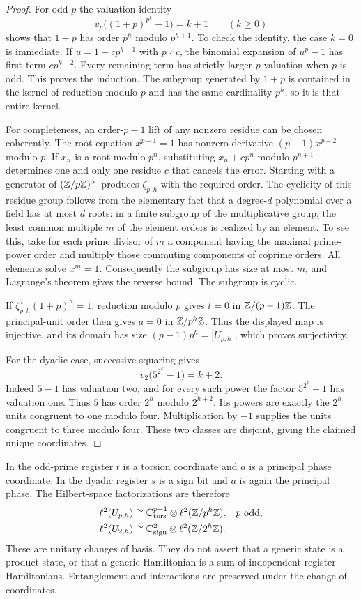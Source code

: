 \begin{proof}
For odd $p$ the valuation identity
\[
 v_p\bigl((1+p)^{p^k}-1\bigr)=k+1
 \qquad(k\geq0)
\]
shows that $1+p$ has order $p^h$ modulo $p^{h+1}$. To check the
identity, the case $k=0$ is immediate. If $u=1+c p^{k+1}$ with
$p\nmid c$, the binomial expansion of $u^p-1$ has first term
$c p^{k+2}$. Every remaining term has strictly larger $p$-valuation
when $p$ is odd. This proves the induction. The subgroup generated by
$1+p$ is contained in the kernel of reduction modulo $p$ and has the
same cardinality $p^h$, so it is that entire kernel.

For completeness, an order-$p-1$ lift of any nonzero residue can be chosen
coherently. The root equation $x^{p-1}=1$ has nonzero derivative
$(p-1)x^{p-2}$ modulo $p$. If $x_n$ is a root modulo $p^n$, substituting
$x_n+c p^n$ modulo $p^{n+1}$ determines one and only one residue $c$
that cancels the error. Starting with a generator of
$(\mathbb Z/p\mathbb Z)^\times$ produces $\zeta_{p,h}$ with the required order.
The cyclicity of this residue group follows from the elementary fact that
a degree-$d$ polynomial over a field has at most $d$ roots: in a finite
subgroup of the multiplicative group, the least common multiple $m$ of
the element orders is realized by an element. To see this, take for each
prime divisor of $m$ a component having the maximal prime-power order
and multiply those commuting components of coprime orders. All elements solve
$x^m=1$. Consequently the subgroup has size at most $m$, and Lagrange's
theorem gives the reverse bound. The subgroup is cyclic.

If $\zeta_{p,h}^{\,t}(1+p)^a=1$, reduction modulo $p$ gives
$t=0$ in $\mathbb Z/(p-1)\mathbb Z$. The principal-unit order then gives
$a=0$ in $\mathbb Z/p^h\mathbb Z$. Thus the displayed map is injective, and its
domain has size $(p-1)p^h=|U_{p,h}|$, which proves surjectivity.

For the dyadic case, successive squaring gives
\[
 v_2\bigl(5^{2^k}-1\bigr)=k+2.
\]
Indeed $5-1$ has valuation two, and for every such power the factor
$5^{2^k}+1$ has valuation one. Thus $5$ has order $2^h$ modulo
$2^{h+2}$. Its powers are exactly the $2^h$ units congruent to one
modulo four. Multiplication by $-1$ supplies the units congruent to
three modulo four. These two classes are disjoint, giving the claimed
unique coordinates.
\end{proof}

In the odd-prime register $t$ is a torsion coordinate and $a$ is a
principal phase coordinate. In the dyadic register $s$ is a sign bit and
$a$ is again the principal phase. The Hilbert-space factorizations are
therefore
\begin{align}
 \ell^2(U_{p,h})&\cong
 \mathbb C^{p-1}_{\mathrm{tors}}\otimes\ell^2(\mathbb Z/p^h\mathbb Z),
 &&p\text{ odd},\nonumber\\
 \ell^2(U_{2,h})&\cong
 \mathbb C^2_{\mathrm{sign}}\otimes\ell^2(\mathbb Z/2^h\mathbb Z).
 \label{a-finite-unit-hilbert}
\end{align}
These are unitary changes of basis. They do not assert that a generic
state is a product state, or that a generic Hamiltonian is a sum of
independent register Hamiltonians. Entanglement and interactions are
preserved under the change of coordinates.

